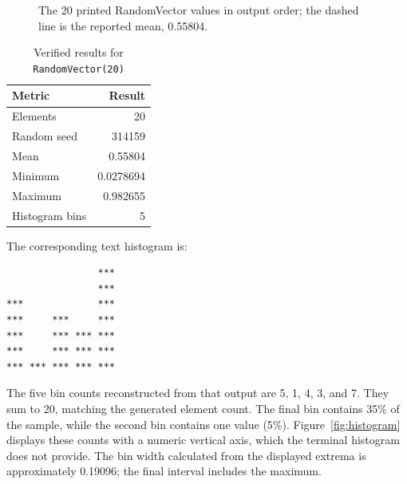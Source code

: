 \documentclass[letterpaper,10pt,conference]{ieeeconf}
\begin{document}
\begin{figure}[!htbp]
\centering
{}
\caption{The 20 printed RandomVector values in output order; the dashed line is the reported mean, 0.55804.}
\label{fig:sequence}
\end{figure}
\FloatBarrier

\begin{table}[t]
\caption{Verified results for \texttt{RandomVector(20)}}
\label{tab:rv}
\centering
\footnotesize
\begin{tabular}{lr}
\toprule
Metric & Result \\
\midrule
Elements & 20 \\
Random seed & 314159 \\
Mean & 0.55804 \\
Minimum & 0.0278694 \\
Maximum & 0.982655 \\
Histogram bins & 5 \\
\bottomrule
\end{tabular}
\end{table}

The corresponding text histogram is:

\noindent\begin{minipage}{0.95\columnwidth}
\begin{lstlisting}
                ***
                ***
***             ***
***     ***     ***
***     *** *** ***
***     *** *** ***
*** *** *** *** ***
\end{lstlisting}
\end{minipage}

The five bin counts reconstructed from that output are 5, 1, 4, 3, and 7. They sum to 20, matching the generated element count. The final bin contains 35\% of the sample, while the second bin contains one value (5\%). Figure~\ref{fig:histogram} displays these counts with a numeric vertical axis, which the terminal histogram does not provide. The bin width calculated from the displayed extrema is approximately 0.19096; the final interval includes the maximum.
\end{document}
